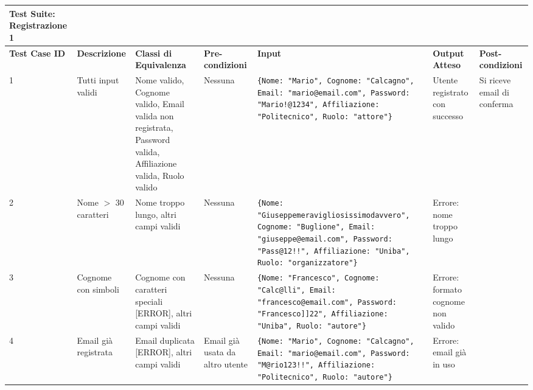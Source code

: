 \begin{sidewaystable}
\begin{tabular}{|p{3cm}|p{2cm}|p{2cm}|p{2cm}|p{4cm}|p{2cm}|p{2cm}|}
\hline
\rowcolor{SkyBlue}
\textbf{Test Suite: Registrazione 1} & & & & & &\\
\hline
\rowcolor{Red}
\textbf{Test Case ID} & \textbf{Descrizione} & \textbf{Classi di Equivalenza} & \textbf{Pre-condizioni} & \textbf{Input} & \textbf{Output Atteso} & \textbf{Post-condizioni} \\
\hline
1 & Tutti input validi & Nome valido, Cognome valido, Email valida non registrata, Password valida, Affiliazione valida, Ruolo valido & Nessuna & \texttt{\{Nome: "Mario", Cognome: "Calcagno", Email: "mario@email.com", Password: "Mario!@1234", Affiliazione: "Politecnico", Ruolo: "attore"\}} & Utente registrato con successo & Si riceve email di conferma \\
\hline
2 & Nome $>$ 30 caratteri & Nome troppo lungo, altri campi validi & Nessuna & \texttt{\{Nome: "Giuseppemeravigliosissimodavvero", Cognome: "Buglione", Email: "giuseppe@email.com", Password: "Pass@12!!", Affiliazione: "Uniba", Ruolo: "organizzatore"\}} & Errore: nome troppo lungo & \\
\hline
3 & Cognome con simboli & Cognome con caratteri speciali [ERROR], altri campi validi & Nessuna & \texttt{\{Nome: "Francesco", Cognome: "Calc@lli", Email: "francesco@email.com", Password: "Francesco]]22", Affiliazione: "Uniba", Ruolo: "autore"\}} & Errore: formato cognome non valido & \\
\hline
4 & Email già registrata & Email duplicata [ERROR], altri campi validi & Email già usata da altro utente & \texttt{\{Nome: "Mario", Cognome: "Calcagno", Email: "mario@email.com", Password: "M@rio123!!", Affiliazione: "Politecnico", Ruolo: "autore"\}} & Errore: email già in uso & \\
\hline
\end{tabular}
\end{sidewaystable}

